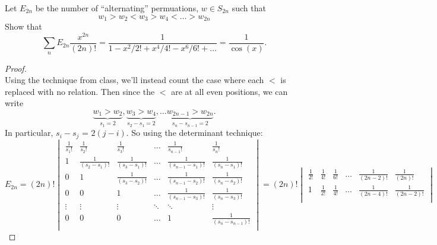 \documentclass{article}
\newenvironment{problem}[2][Problem]{\begin{trivlist}
\item[\hskip \labelsep {\bfseries #1}\hskip \labelsep {\bfseries #2.}]}{\end{trivlist}}
\begin{document}
\pagebreak
\begin{problem}{3}
  Let $E_{2n}$ be the number of ``alternating'' permuations,
  $w \in S_{2n}$ such that \[
    w_1 > w_2 < w_3 > w_4 < \hdots > w_{2n}
  \]
  Show that \[
    \sum_n E_{2n}\frac{x^{2n}}{(2n)!}
    = \frac{1}{1 - x^2/2! + x^4/4! - x^6/6! + \hdots}
    = \frac{1}{\cos(x)}.
  \]
\end{problem}

\begin{proof} \text{} \\
  Using the technique from class, we'll instead count the case where each $<$
  is replaced with no relation. Then since the $<$ are at all even positions,
  we can write \[
    \underbrace{w_1 > w_2}_{s_1 = 2},
    \underbrace{w_3 > w_4}_{s_2 - s_1 = 2},
    \hdots
    \underbrace{w_{2n-1} > w_{2n}}_{s_n - s_{n-1} = 2}.
  \]
  In particular, $s_i - s_j$ = $2(j - i)$.
  So using the determinant technique: \[
    E_{2n} = (2n)! \begin{vmatrix}
      \frac{1}{s_1!} &    \frac{1}{s_2!}         & \frac{1}{s_3!}         & \hdots & \frac{1}{s_{n-1}!}         & \frac{1}{s_n!} \\
                   1 &    \frac{1}{(s_2 - s_1)!} & \frac{1}{(s_3 - s_1)!} & \hdots & \frac{1}{(s_{n-1} - s_1)!} & \frac{1}{(s_n - s_1)!}\\
                   0 &                         1 & \frac{1}{(s_3 - s_2)!} & \hdots & \frac{1}{(s_{n-1} - s_2)!} & \frac{1}{(s_n - s_2)!}\\
                   0 &                         0 & 1                      & \hdots & \frac{1}{(s_{n-1} - s_3)!} & \frac{1}{(s_n - s_3)!}\\
              \vdots &                    \vdots & \vdots                 & \ddots & \ddots                     & \vdots \\
                   0 &                         0 &                      0 & \hdots & 1                          & \frac{1}{(s_n - s_{n-1})!}\\
    \end{vmatrix}
    = (2n)! \begin{vmatrix}
      \frac{1}{2!} & \frac{1}{4!} & \frac{1}{6!}         & \hdots & \frac{1}{(2n-2)!}         & \frac{1}{(2n)!} \\
      1            & \frac{1}{2!} & \frac{1}{4!}         & \hdots & \frac{1}{(2n-4)!}         & \frac{1}{(2n-2)!} \\

\end{vmatrix}\]
\end{proof}
\end{document}
